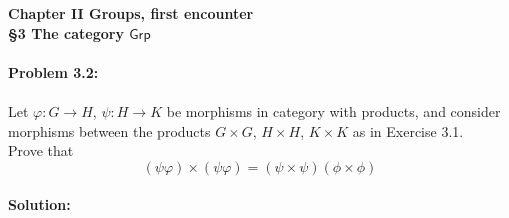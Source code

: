 \documentclass[12pt]{article}
\begin{document}
\noindent \textbf{Chapter II Groups, first encounter \\ \S 3 The category $\mathsf{Grp}$ \\ \\ Problem 3.2:}
\\
\\ 
Let $\varphi: G \to H$, $\psi: H \to K$ be morphisms in category with products, and consider morphisms between the products $G \times G$, $H \times H$, $K \times K$ as in Exercise 3.1. \\
Prove that\\
$$(\psi \varphi)\times (\psi \varphi)=(\psi \times \psi)(\phi \times \phi)$$
\\
\noindent \textbf{Solution:} \\
\end{document}
